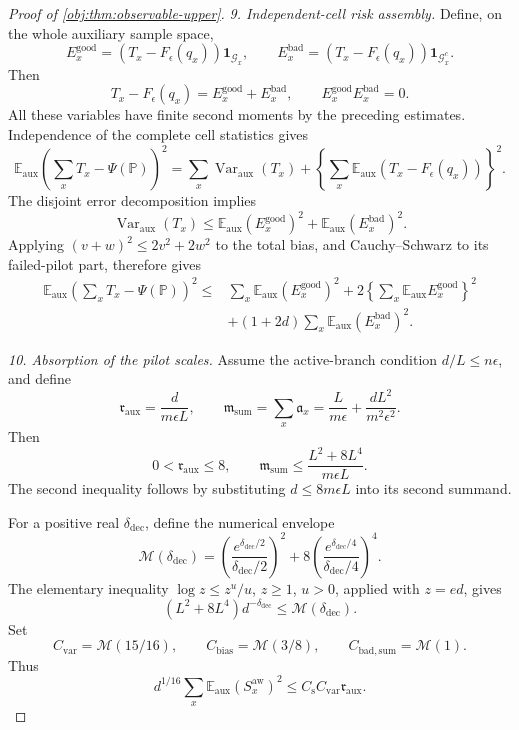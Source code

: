 \begin{proof}[Proof of \cref{obj:thm:observable-upper}]
\textit{9. Independent-cell risk assembly.}
Define, on the whole auxiliary sample space,
\[
E_x^{\mathrm{good}}
=
(T_x-F_\epsilon(q_x))\mathbf1_{\mathcal G_x},
\qquad
E_x^{\mathrm{bad}}
=
(T_x-F_\epsilon(q_x))\mathbf1_{\mathcal G_x^c}.
\]
Then
\[
T_x-F_\epsilon(q_x)=E_x^{\mathrm{good}}+E_x^{\mathrm{bad}},
\qquad
E_x^{\mathrm{good}}E_x^{\mathrm{bad}}=0.
\]
All these variables have finite second moments by the preceding estimates. Independence of the complete cell statistics gives
\[
\mathbb E_{\mathrm{aux}}
\left(\sum_xT_x-\Psi(\mathbb P)\right)^2
=
\sum_x\operatorname{Var}_{\mathrm{aux}}(T_x)
+
\left\{\sum_x
\mathbb E_{\mathrm{aux}}(T_x-F_\epsilon(q_x))\right\}^2.
\]
The disjoint error decomposition implies
\[
\operatorname{Var}_{\mathrm{aux}}(T_x)
\le
\mathbb E_{\mathrm{aux}}(E_x^{\mathrm{good}})^2
+
\mathbb E_{\mathrm{aux}}(E_x^{\mathrm{bad}})^2.
\]
Applying \((v+w)^2\le2v^2+2w^2\) to the total bias, and Cauchy--Schwarz to its failed-pilot part, therefore gives
\[
\begin{aligned}
\mathbb E_{\mathrm{aux}}
\left(\sum_xT_x-\Psi(\mathbb P)\right)^2
\le{}&
\sum_x\mathbb E_{\mathrm{aux}}(E_x^{\mathrm{good}})^2
+
2\left\{\sum_x\mathbb E_{\mathrm{aux}}E_x^{\mathrm{good}}\right\}^2\\
&+
(1+2d)\sum_x\mathbb E_{\mathrm{aux}}(E_x^{\mathrm{bad}})^2.
\end{aligned}
\]

\textit{10. Absorption of the pilot scales.}
Assume the active-branch condition \(d/L\le n\epsilon\), and define
\[
\mathfrak r_{\mathrm{aux}}=\frac{d}{m\epsilon L},
\qquad
\mathfrak m_{\mathrm{sum}}
=\sum_x\mathfrak a_x
=\frac L{m\epsilon}+\frac{dL^2}{m^2\epsilon^2}.
\]
Then
\[
0<\mathfrak r_{\mathrm{aux}}\le8,
\qquad
\mathfrak m_{\mathrm{sum}}
\le\frac{L^2+8L^4}{m\epsilon L}.
\]
The second inequality follows by substituting
\(d\le8m\epsilon L\) into its second summand.

For a positive real \(\delta_{\mathrm{dec}}\), define the numerical envelope
\[
\mathcal M(\delta_{\mathrm{dec}})
=
\left(\frac{e^{\delta_{\mathrm{dec}}/2}}{\delta_{\mathrm{dec}}/2}\right)^2
+
8\left(\frac{e^{\delta_{\mathrm{dec}}/4}}{\delta_{\mathrm{dec}}/4}\right)^4.
\]
The elementary inequality \(\log z\le z^u/u\), \(z\ge1\), \(u>0\), applied with \(z=ed\), gives
\[
(L^2+8L^4)d^{-\delta_{\mathrm{dec}}}
\le\mathcal M(\delta_{\mathrm{dec}}).
\]
Set
\[
C_{\mathrm{var}}=\mathcal M(15/16),\qquad
C_{\mathrm{bias}}=\mathcal M(3/8),\qquad
C_{\mathrm{bad,sum}}=\mathcal M(1).
\]
Thus
\[
d^{1/16}\sum_x\mathbb E_{\mathrm{aux}}(S_x^{\mathrm{aw}})^2
\le C_{\mathrm s}C_{\mathrm{var}}\mathfrak r_{\mathrm{aux}}.
\]


\end{proof}
